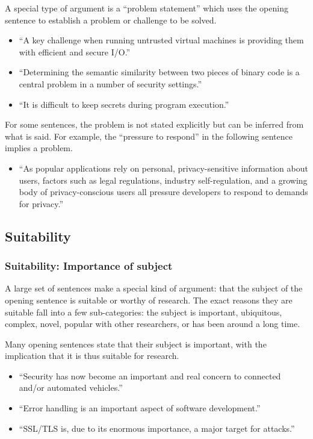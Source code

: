 \documentclass[sigconf]{acmart}
\begin{document}
	A special type of argument is a “problem statement” which uses the opening sentence to establish a problem or challenge to be solved.
	\begin{itemize}
		\item ``A key challenge when running untrusted virtual machines is providing them with efficient and secure I/O.''~\cite{smolyar2015securing}

		\item``Determining the semantic similarity between two pieces of binary code is a central problem in a number of security settings.''~\cite{egele2014blanket}

		\item``It is difficult to keep secrets during program execution.''~\cite{rane2015raccoon}

		\end{itemize}
For some sentences, the problem is not stated explicitly but can be inferred from what is said. For example, the “pressure to respond” in the following sentence implies a problem.

\begin{itemize}

		\item ``As popular applications rely on personal, privacy-sensitive information about users, factors such as legal regulations, industry self-regulation, and a growing body of privacy-conscious users all pressure developers to respond to demands for privacy.''~\cite{fredrikson2014zo}
	\end{itemize}


	\subsection{Suitability}
	\subsubsection{Suitability: Importance of subject}

	A large set of sentences make a special kind of argument: that the subject of the opening sentence is suitable or worthy of research. The exact reasons they are suitable fall into a few sub-categories: the subject is important, ubiquitous, complex, novel, popular with other researchers, or has been around a long time.

	Many opening sentences state that their subject is important, with the implication that it is thus suitable for research.
	\begin{itemize}
		\item 	``Security has now become an important and real concern to connected and/or automated vehicles.''~\cite{cho2016fingerprinting}

		\item 	``Error handling is an important aspect of software development.''~\cite{jana2016automatically}

		\item 	``SSL/TLS is, due to its enormous importance, a major target for attacks.''~\cite{meyer2014revisiting}
	\end{itemize}
\end{document}
